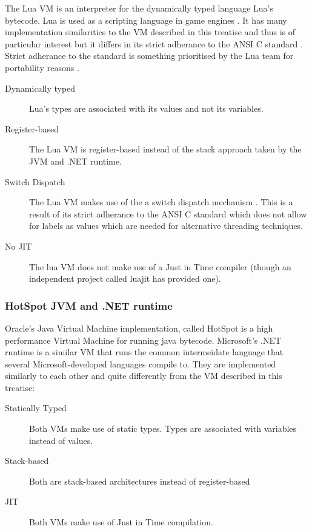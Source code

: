 \documentclass[english,a4paper]{article}
\begin{document}
The Lua VM is an interpreter for the dynamically typed language Lua's
bytecode. Lua is used as a scripting language in game engines
\cite{LuaUsed}. It has many implementation similarities to the VM
described in this treatise and thus is of particular interest but it
differs in its strict adherance to the ANSI C standard
\cite{RobertoIerusalimschy}. Strict adherance to the standard is
something prioritised by the Lua team for portability reasons
\cite{RobertoIerusalimschy}.
\begin{description}
\item[Dynamically typed] Lua's types are associated with its values
  and not its variables.
\item[Register-based] The Lua VM is register-based instead of the
  stack approach taken by the JVM and .NET runtime.
\item[Switch Dispatch] The Lua VM makes use of the a switch dispatch
  mechanism \cite{Lua.Source}. This is a result of its strict
  adherance to the ANSI C standard which does not allow for labels as
  values which are needed for alternative threading techniques.
\item[No JIT] The lua VM does not make use of a Just in Time compiler
  (though an independent project called luajit has provided one).
\end{description}

\subsubsection{HotSpot JVM and .NET runtime}
Oracle's Java Virtual Machine implementation, called HotSpot is a
high performance Virtual Machine for running java
bytecode. Microsoft's .NET runtime is a similar VM that runs the
common intermeidate language that several Microsoft-developed
languages compile to. They are implemented similarly to each other and
quite differently from the VM described in this treatise:
\begin{description}
\item[Statically Typed] Both VMs make use of static types. Types are
  associated with variables instead of values.
\item[Stack-based] Both are stack-based architectures instead of
  register-based
\item[JIT] Both VMs make use of Just in Time compilation.
\end{description}
\end{document}
